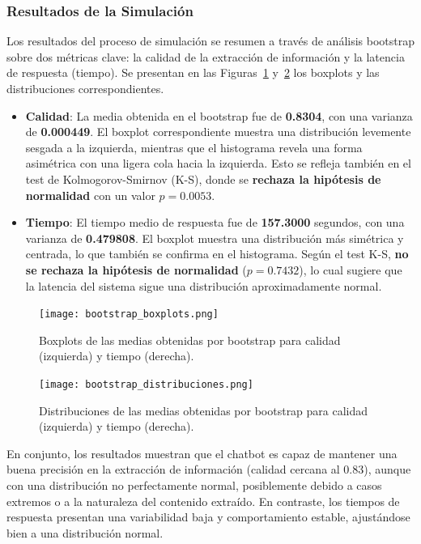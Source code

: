 \documentclass[runningheads]{llncs}
\begin{document}
\subsubsection{Resultados de la Simulación}

Los resultados del proceso de simulación se resumen a través de análisis bootstrap sobre dos métricas clave: la calidad de la extracción de información y la latencia de respuesta (tiempo). Se presentan en las Figuras~\ref{fig:boxplots-bootstrap} y~\ref{fig:distribuciones-bootstrap} los boxplots y las distribuciones correspondientes.

\begin{itemize}
    \item \textbf{Calidad}: La media obtenida en el bootstrap fue de \textbf{0.8304}, con una varianza de \textbf{0.000449}. El boxplot correspondiente muestra una distribución levemente sesgada a la izquierda, mientras que el histograma revela una forma asimétrica con una ligera cola hacia la izquierda. Esto se refleja también en el test de Kolmogorov-Smirnov (K-S), donde se \textbf{rechaza la hipótesis de normalidad} con un valor $p = 0.0053$.
    
    \item \textbf{Tiempo}: El tiempo medio de respuesta fue de \textbf{157.3000} segundos, con una varianza de \textbf{0.479808}. El boxplot muestra una distribución más simétrica y centrada, lo que también se confirma en el histograma. Según el test K-S, \textbf{no se rechaza la hipótesis de normalidad} ($p = 0.7432$), lo cual sugiere que la latencia del sistema sigue una distribución aproximadamente normal.
\end{itemize}

\begin{figure}[H]
    \centering
    \texttt{[image: bootstrap\_boxplots.png]}
    \caption{Boxplots de las medias obtenidas por bootstrap para calidad (izquierda) y tiempo (derecha).}
    \label{fig:boxplots-bootstrap}
\end{figure}

\begin{figure}[H]
    \centering
    \texttt{[image: bootstrap\_distribuciones.png]}
    \caption{Distribuciones de las medias obtenidas por bootstrap para calidad (izquierda) y tiempo (derecha).}
    \label{fig:distribuciones-bootstrap}
\end{figure}

En conjunto, los resultados muestran que el chatbot es capaz de mantener una buena precisión en la extracción de información (calidad cercana al 0.83), aunque con una distribución no perfectamente normal, posiblemente debido a casos extremos o a la naturaleza del contenido extraído. En contraste, los tiempos de respuesta presentan una variabilidad baja y comportamiento estable, ajustándose bien a una distribución normal.
\end{document}
